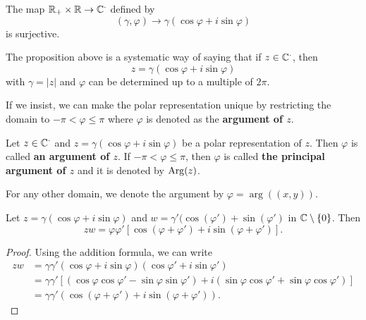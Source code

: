 \documentclass[a4paper]{report}
\begin{document}
\begin{prop}
   The map \( {\mathbb{R}}_{+} \times \mathbb{R} \to \mathbb{C}^{\cdot} \) defined by  
   \[  (\gamma, \varphi) \longrightarrow \gamma (\cos \varphi + i \sin \varphi ) \]
   is surjective.
\end{prop}

\begin{remark}
The proposition above is a systematic way of saying that if \( z \in \mathbb{C}^{\cdot} \), then     
\[  z = \gamma (\cos \varphi + i \sin \varphi ) \]
with \( \gamma = | z  |  \) and \( \varphi  \) can be determined up to a multiple of \( 2 \pi \).
\end{remark}

If we insist, we can make the polar representation unique by restricting the domain to \( -\pi < \varphi \leq \pi \) where \( \varphi  \) is denoted as the \textbf{argument of \( z  \)}.

\begin{definition}
    Let \( z \in \mathbb{C}^{\cdot} \) and \( z = \gamma (\cos \varphi + i \sin \varphi) \) be a polar representation of \( z  \). Then \( \varphi  \) is called \textbf{an argument of \( z  \)}. If \( - \pi < \varphi \leq \pi \), then \( \varphi  \) is called \textbf{the principal argument of \( z \)} and it is denoted by \( \operatorname{Arg}(z) \). 
\end{definition}
\begin{remark}
    For any other domain, we denote the argument by \( \varphi = \arg((x,y)) \).
\end{remark}

\begin{lemma}
    Let \( z = \gamma(\cos \varphi + i \sin \varphi) \) and \( w = \gamma' (\cos(\varphi') + \sin(\varphi') \) in \( \mathbb{C} \setminus  \{ 0  \}  \). Then
    \[  zw = \varphi \varphi' [\cos(\varphi + \varphi') + i \sin(\varphi + \varphi')]. \]
\end{lemma}
\begin{proof}
Using the addition formula, we can write
\begin{align*}
    zw &= \gamma \gamma'  (\cos \varphi + i \sin \varphi)(\cos \varphi' + i \sin \varphi')  \\
       &= \gamma \gamma' [ (\cos \varphi \cos \varphi' - \sin \varphi \sin \varphi') + i(\sin \varphi \cos \varphi' + \sin \varphi \cos \varphi') ] \\
       &= \gamma \gamma' (\cos(\varphi + \varphi') + i \sin(\varphi + \varphi')).
\end{align*}
\end{proof}
\end{document}
